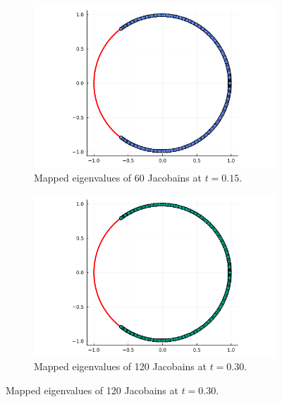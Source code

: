 \documentclass[12pt]{report}
\begin{document}
\begin{solution}
\begin{enumerate}
        \begin{figure}[H]
            \begin{subfigure}[b]{0.45\linewidth}
                \centering
                \includegraphics[width=\linewidth]{images/2b-1.png}
                \caption{Mapped eigenvalues of 60 Jacobains at $t=0.15$.}
                \label{fig2evals:a}
                \vspace{4ex}
            \end{subfigure}%
            \begin{subfigure}[b]{0.45\linewidth}
                \centering
                \includegraphics[width=\linewidth]{images/2b-2.png}
                \caption{Mapped eigenvalues of 120 Jacobains at $t=0.30$.}
                \label{fig2evals:b}
                \vspace{4ex}
            \end{subfigure}

\end{figure}
\end{enumerate}
\end{solution}
\end{document}
